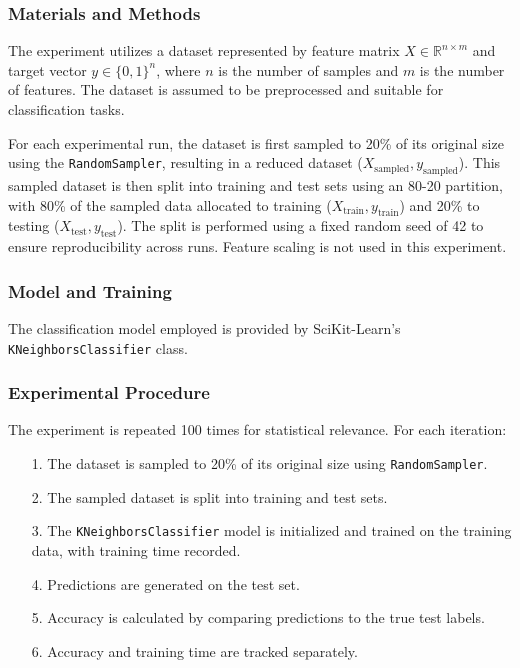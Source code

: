 \documentclass{article}
\theoremstyle{plain}
\theoremstyle{definition}
\theoremstyle{remark}
\begin{document}
\subsubsection{Materials and Methods}

The experiment utilizes a dataset represented by feature matrix $ X \in \mathbb{R}^{n \times m} $ and target vector $ y \in \{0, 1\}^n $, where $ n $ is the number of samples and $ m $ is the number of features. The dataset is assumed to be preprocessed and suitable for classification tasks.

For each experimental run, the dataset is first sampled to 20\% of its original size using the \texttt{RandomSampler}, resulting in a reduced dataset ($ X_{\text{sampled}}, y_{\text{sampled}} $). This sampled dataset is then split into training and test sets using an 80-20 partition, with 80\% of the sampled data allocated to training ($ X_{\text{train}}, y_{\text{train}} $) and 20\% to testing ($ X_{\text{test}}, y_{\text{test}} $). The split is performed using a fixed random seed of 42 to ensure reproducibility across runs. Feature scaling is not used in this experiment.

\subsubsection{Model and Training}

The classification model employed is provided by SciKit-Learn's \texttt{KNeighborsClassifier} class.

\subsubsection{Experimental Procedure}

The experiment is repeated 100 times for statistical relevance. For each iteration:

\begin{itemize}
	\item [1.] The dataset is sampled to 20\% of its original size using \texttt{RandomSampler}.
	\item [2.] The sampled dataset is split into training and test sets.
	\item [3.] The \texttt{KNeighborsClassifier} model is initialized and trained on the training data, with training time recorded.
	\item [4.] Predictions are generated on the test set.
	\item [5.] Accuracy is calculated by comparing predictions to the true test labels.
	\item [6.] Accuracy and training time are tracked separately.
\end{itemize}
\end{document}
